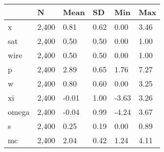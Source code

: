 \begin{table}[htbp]
\begin{tabular}{|l|l|l|l|l|l|}\hline  
 & N  & Mean  & SD  & Min  & Max  \\ \hline  
x &     2,400 &      0.81 &      0.62 &      0.00 &      3.46 \\ \hline 
sat &     2,400 &      0.50 &      0.50 &      0.00 &      1.00 \\ \hline 
wire &     2,400 &      0.50 &      0.50 &      0.00 &      1.00 \\ \hline 
p &     2,400 &      2.89 &      0.65 &      1.76 &      7.27 \\ \hline 
w &     2,400 &      0.80 &      0.60 &      0.00 &      3.25 \\ \hline 
xi &     2,400 &     -0.01 &      1.00 &     -3.63 &      3.26 \\ \hline 
omega &     2,400 &     -0.04 &      0.99 &     -4.24 &      3.67 \\ \hline 
s &     2,400 &      0.25 &      0.19 &      0.00 &      0.89 \\ \hline 
mc &     2,400 &      2.04 &      0.42 &      1.24 &      4.11 \\ \hline 
  \end{tabular}
\end{table}
